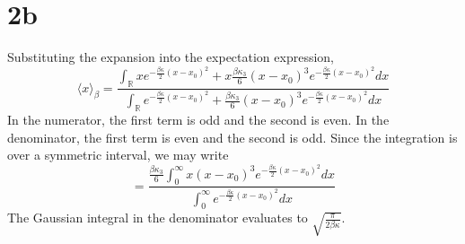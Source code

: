 \documentclass{article}
\begin{document}
\section*{2b}
Substituting the expansion into the expectation expression,
\[
  \langle x \rangle_{\beta}=\frac{\int_{\mathbb{R}}xe^{-\frac{\beta\kappa}{2}(x-x_{0})^{2}}
    +x\frac{\beta\kappa_{3}}{6}(x-x_{0})^{3}e^{-\frac{\beta\kappa}{2}(x-x_{0})^{2}}dx}
  {\int_{\mathbb{R}}e^{-\frac{\beta\kappa}{2}(x-x_{0})^{2}}+\frac{\beta\kappa_{3}}{6}(x-x_{0})^{3}e^{-\frac{\beta\kappa}{2}(x-x_{0})^{2}}dx}
\]
In the numerator, the first term is odd and the second is even.
In the denominator, the first term is even and the second is odd.
Since the integration is over a symmetric interval, we may write
\[=\frac{\frac{\beta\kappa_{3}}{6}\int_{0}^{\infty}x(x-x_{0})^{3}e^{-\frac{\beta\kappa}{2}(x-x_{0})^{2}}dx}
  {\int_{0}^{\infty}e^{-\frac{\beta\kappa}{2}(x-x_{0})^{2}}dx}\]
The Gaussian integral in the denominator evaluates to $\sqrt{\frac{\pi}{2\beta\kappa}}$.
\end{document}
